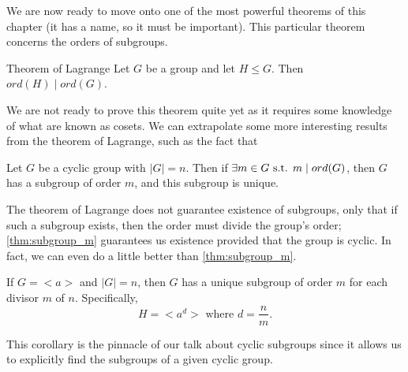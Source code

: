 We are now ready to move onto one of the most powerful theorems of this chapter (it has a name, so it must be important). This particular theorem concerns the orders of subgroups.
\begin{theorem}{Theorem of Lagrange}\label{thm:lagrange}
	Let $G$ be a group and let $H\leq G$. Then $ord(H)\mid ord(G)$.
\end{theorem}
We are not ready to prove this theorem quite yet as it requires some knowledge of what are known as cosets. We can extrapolate some more interesting results from the theorem of Lagrange, such as the fact that
\begin{theorem}{}\label{thm:subgroup_m}
	Let $G$ be a cyclic group with $|G|=n$. Then if $\exists m\in G\text{ s.t. } m\mid ord(G)$, then $G$ has a subgroup of order $m$, and this subgroup is unique.
\end{theorem}
The theorem of Lagrange does not guarantee existence of subgroups, only that if such a subgroup exists, then the order must divide the group's order; \cref{thm:subgroup_m} guarantees us existence provided that the group is cyclic. In fact, we can even do a little better than \cref{thm:subgroup_m}.
\begin{corollary}
	If $G=<a>$ and $|G|=n$, then $G$ has a unique subgroup of order $m$ for each divisor $m$ of $n$. Specifically,
	\[
		H=<a^{d}>\text{ where } d=\frac{n}{m}.
	\]
\end{corollary}
This corollary is the pinnacle of our talk about cyclic subgroups since it allows us to explicitly find the subgroups of a given cyclic group.

